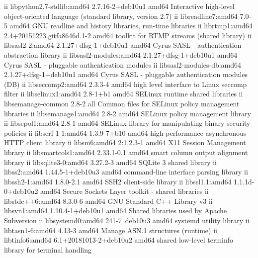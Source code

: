 ii  libpython2.7-stdlib:amd64  2.7.16-2+deb10u1            amd64        Interactive high-level object-oriented language (standard library, version 2.7)
ii  libreadline7:amd64         7.0-5                       amd64        GNU readline and history libraries, run-time libraries
ii  librtmp1:amd64             2.4+20151223.gitfa8646d.1-2 amd64        toolkit for RTMP streams (shared library)
ii  libsasl2-2:amd64           2.1.27+dfsg-1+deb10u1       amd64        Cyrus SASL - authentication abstraction library
ii  libsasl2-modules:amd64     2.1.27+dfsg-1+deb10u1       amd64        Cyrus SASL - pluggable authentication modules
ii  libsasl2-modules-db:amd64  2.1.27+dfsg-1+deb10u1       amd64        Cyrus SASL - pluggable authentication modules (DB)
ii  libseccomp2:amd64          2.3.3-4                     amd64        high level interface to Linux seccomp filter
ii  libselinux1:amd64          2.8-1+b1                    amd64        SELinux runtime shared libraries
ii  libsemanage-common         2.8-2                       all          Common files for SELinux policy management libraries
ii  libsemanage1:amd64         2.8-2                       amd64        SELinux policy management library
ii  libsepol1:amd64            2.8-1                       amd64        SELinux library for manipulating binary security policies
ii  libserf-1-1:amd64          1.3.9-7+b10                 amd64        high-performance asynchronous HTTP client library
ii  libsm6:amd64               2:1.2.3-1                   amd64        X11 Session Management library
ii  libsmartcols1:amd64        2.33.1-0.1                  amd64        smart column output alignment library
ii  libsqlite3-0:amd64         3.27.2-3                    amd64        SQLite 3 shared library
ii  libss2:amd64               1.44.5-1+deb10u3            amd64        command-line interface parsing library
ii  libssh2-1:amd64            1.8.0-2.1                   amd64        SSH2 client-side library
ii  libssl1.1:amd64            1.1.1d-0+deb10u2            amd64        Secure Sockets Layer toolkit - shared libraries
ii  libstdc++6:amd64           8.3.0-6                     amd64        GNU Standard C++ Library v3
ii  libsvn1:amd64              1.10.4-1+deb10u1            amd64        Shared libraries used by Apache Subversion
ii  libsystemd0:amd64          241-7~deb10u3               amd64        systemd utility library
ii  libtasn1-6:amd64           4.13-3                      amd64        Manage ASN.1 structures (runtime)
ii  libtinfo6:amd64            6.1+20181013-2+deb10u2      amd64        shared low-level terminfo library for terminal handling
